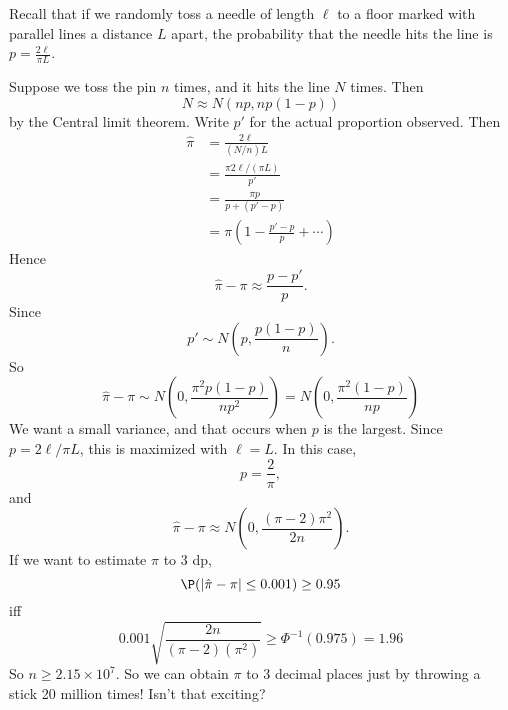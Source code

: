 \documentclass[a4paper]{article}
\begin{document}
\begin{eg}
  Recall that if we randomly toss a needle of length $\ell$ to a floor marked with parallel lines a distance $L$ apart, the probability that the needle hits the line is $p = \frac{2\ell}{\pi L}$.
  \begin{center}
  \end{center}
  Suppose we toss the pin $n$ times, and it hits the line $N$ times. Then
  \[
    N\approx N(np, np(1 - p))
  \]
  by the Central limit theorem. Write $p'$ for the actual proportion observed. Then
  \begin{align*}
    \hat{\pi} &= \frac{2\ell}{(N/n) L} \\
    &= \frac{\pi 2\ell/(\pi L)}{p'}\\
    &= \frac{\pi p}{p + (p' - p)}\\
    &= \pi \left(1 - \frac{p' - p}{p} + \cdots \right)
  \end{align*}
  Hence
  \[
    \hat\pi - \pi \approx \frac{p - p'}{p}.
  \]
  Since
  \[
    p' \sim N\left(p, \frac{p(1 - p)}{n}\right).
  \]
  So
  \[
    \hat \pi - \pi \sim N\left(0, \frac{\pi^2 p(1 - p)}{np^2}\right) = N\left(0, \frac{\pi^2(1 - p)}{np}\right)
  \]
  We want a small variance, and that occurs when $p$ is the largest. Since $p = 2\ell/\pi L$, this is maximized with $\ell = L$. In this case,
  \[
    p = \frac{2}{\pi},
  \]
  and
  \[
    \hat \pi - \pi \approx N\left(0, \frac{(\pi - 2)\pi^2}{2n}\right).
  \]
  If we want to estimate $\pi$ to 3 dp,
  \[
    \P(|\hat \pi - \pi| \leq 0.001) \geq 0.95
  \]
  iff
  \[
    0.001\sqrt{\frac{2n}{(\pi - 2)(\pi^2)}} \geq \Phi^{-1}(0.975) = 1.96
  \]
  So $n\geq 2.15 \times 10^7$. So we can obtain $\pi$ to 3 decimal places just by throwing a stick 20 million times! Isn't that exciting?
\end{eg}
\end{document}
